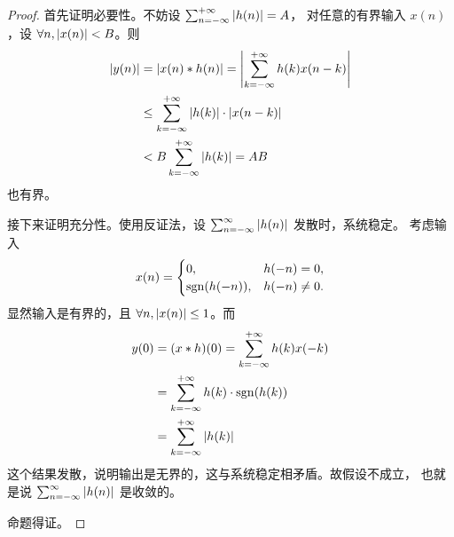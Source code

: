 \begin{proof}
    首先证明必要性。不妨设 $\sum_{n= -\infty}^{+\infty}\left|h(n)\right| = A$，
    对任意的有界输入 $x(n)$，设 $\forall n, \left|x(n)\right| < B$。则
    \begin{align*}
        \left|y(n)\right| & = \left|x(n) * h(n)\right| = \left|\sum_{k = -\infty}^{+\infty}h(k)x(n - k)\right| \\
        & \le \sum_{k = -\infty}^{+\infty} \left|h(k)\right| \cdot \left|x(n - k)\right| \\
        & < B \sum_{k = -\infty}^{+\infty} \left|h(k)\right| = AB
    \end{align*}
    也有界。

    接下来证明充分性。使用反证法，设 $\sum_{n = -\infty}^{\infty} \left|h(n)\right|$ 发散时，系统稳定。
    考虑输入
    \begin{align*}
        x(n) = \begin{cases}
                0, & h(-n) = 0, \\
                \mathrm{sgn}(h(-n)), & h(-n) \neq 0.
            \end{cases}
    \end{align*}
    显然输入是有界的，且 $\forall n, \left|x(n)\right| \le 1$。而
    \begin{align*}
        y(0) & = (x * h)(0) = \sum_{k = -\infty}^{+\infty}h(k)x(-k) \\
        & = \sum_{k = -\infty}^{+\infty}h(k) \cdot \mathrm{sgn}(h(k)) \\
        & = \sum_{k = -\infty}^{+\infty}\left|h(k)\right|
    \end{align*}
    这个结果发散，说明输出是无界的，这与系统稳定相矛盾。故假设不成立，
    也就是说 $\sum_{n = -\infty}^{\infty} \left|h(n)\right|$ 是收敛的。

    命题得证。
\end{proof}

